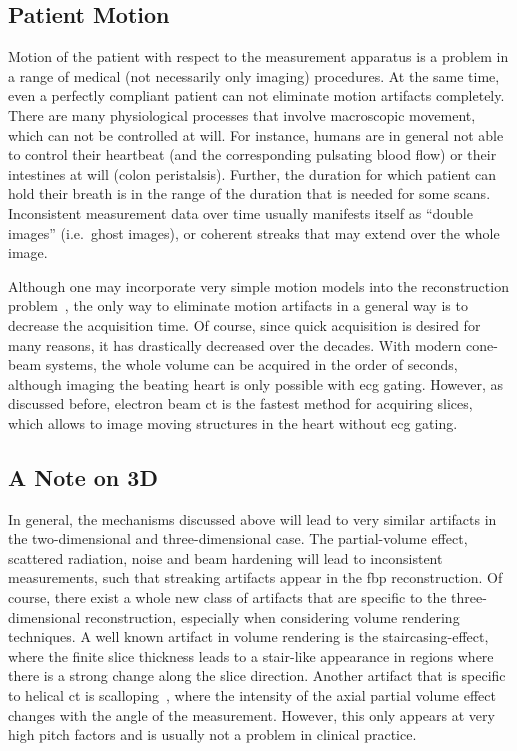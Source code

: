 \documentclass[../ml-ct.tex]{subfiles}
\begin{document}
\subsection{Patient Motion}
Motion of the patient with respect to the measurement apparatus is a problem in a range of medical (not necessarily only imaging) procedures.
At the same time, even a perfectly compliant patient can not eliminate motion artifacts completely.
There are many physiological processes that involve macroscopic movement, which can not be controlled at will.
For instance, humans are in general not able to control their heartbeat (and the corresponding pulsating blood flow) or their intestines at will (colon peristalsis).
Further, the duration for which patient can hold their breath is in the range of the duration that is needed for some scans.
Inconsistent measurement data over time usually manifests itself as \enquote{double images} (i.e.\ ghost images), or coherent streaks that may extend over the whole image.

Although one may incorporate very simple motion models into the reconstruction problem~\cite{rit_motion_2009, schumacher_flexible_2007}, the only way to eliminate motion artifacts in a general way is to decrease the acquisition time.
Of course, since quick acquisition is desired for many reasons, it has drastically decreased over the decades.
With modern cone-beam systems, the whole volume can be acquired in the order of seconds, although imaging the beating heart is only possible with \gls{ecg} gating.
However, as discussed before, electron beam \gls{ct} is the fastest method for acquiring slices, which allows to image moving structures in the heart without \gls{ecg} gating.
\subsection{A Note on 3D}
In general, the mechanisms discussed above will lead to very similar artifacts in the two-dimensional and three-dimensional case.
The partial-volume effect, scattered radiation, noise and beam hardening will lead to inconsistent measurements, such that streaking artifacts appear in the \gls{fbp} reconstruction.
Of course, there exist a whole new class of artifacts that are specific to the three-dimensional reconstruction, especially when considering volume rendering techniques.
A well known artifact in volume rendering is the staircasing-effect, where the finite slice thickness leads to a stair-like appearance in regions where there is a strong change along the slice direction.
Another artifact that is specific to helical \gls{ct} is scalloping~\cite{blanck_understanding_1998}, where the intensity of the axial partial volume effect changes with the angle of the measurement.
However, this only appears at very high pitch factors and is usually not a problem in clinical practice.
\end{document}
